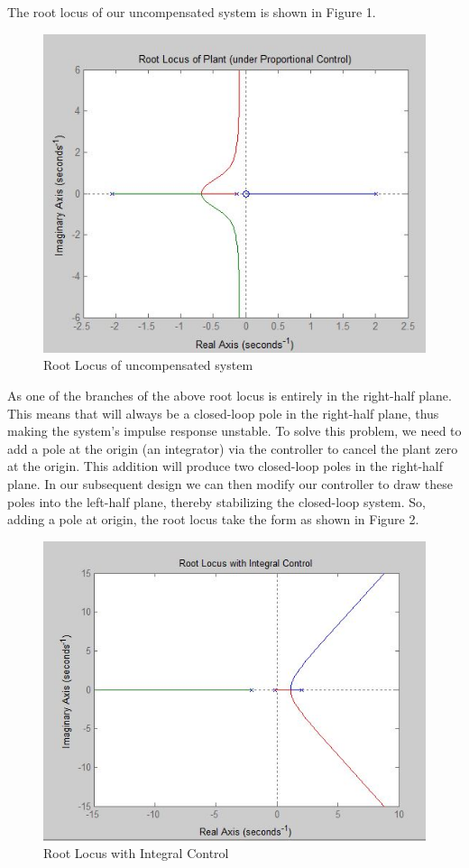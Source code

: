 \documentclass{article}
\begin{document}
The root locus of our uncompensated system is shown in Figure 1.
\begin{figure}[h]
  \includegraphics[width=\linewidth]{fig1.JPG}
  \caption{Root Locus of uncompensated system}
  \label{fig:boat1}
\end{figure}
As one of the branches of the above root locus is entirely in the right-half plane. This means that will always be a closed-loop pole in the right-half plane, thus making the system's impulse response unstable. To solve this problem, we need to add a pole at the origin (an integrator) via the controller to cancel the plant zero at the origin. This addition will produce two closed-loop poles in the right-half plane. 
In our subsequent design we can then modify our controller to draw these poles into the left-half plane, thereby stabilizing the closed-loop system. So, adding a pole at origin, the root locus take the form as shown in Figure 2.
\begin{figure}[h]
  \includegraphics[width=\linewidth]{fig2.JPG}
  \caption{Root Locus with Integral Control}
  \label{fig:boat1}
\end{figure}
\end{document}
